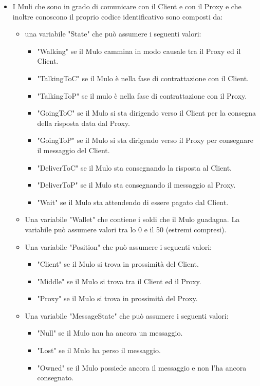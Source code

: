 \documentclass[13pt,a4paper]{article}
\begin{document}
\begin{itemize}
	
	\item I Muli che sono in grado di comunicare con il Client e con il Proxy e che inoltre conoscono il proprio codice identificativo sono composti da:
	\begin{itemize}
		\item una variabile "State" che può assumere i seguenti valori:
		\begin{itemize}
			\item "Walking" se il Mulo cammina in modo causale tra il Proxy ed il Client.
			\item "TalkingToC" se il Mulo è nella fase di contrattazione con il Client.
			\item "TalkingToP" se il mulo è nella fase di contrattazione con il Proxy.
			\item "GoingToC" se il Mulo si sta dirigendo verso il Client per la consegna della risposta data dal Proxy.
			\item "GoingToP" se il Mulo si sta dirigendo verso il Proxy per consegnare il messaggio del Client.
			\item "DeliverToC" se il Mulo sta consegnando la risposta al Client.
			\item "DeliverToP" se il Mulo sta consegnando il messaggio al Proxy.
			\item "Wait" se il Mulo sta attendendo di essere pagato dal Client.
		\end{itemize}
		\item Una variabile "Wallet" che contiene i soldi che il Mulo guadagna.  La variabile può assumere valori tra lo 0 e il 50 (estremi compresi).
		\item Una variabile "Position" che può assumere i seguenti valori:
		\begin{itemize}
			\item "Client" se il Mulo si trova in prossimità del Client.
			\item "Middle" se il Mulo si trova tra il Client ed il Proxy.
			\item "Proxy" se il Mulo si trova in prossimità del Proxy.
		\end{itemize}
	\item Una variabile "MessageState" che può assumere i seguenti valori:
	\begin{itemize}
		\item "Null" se il Mulo non ha ancora un messaggio.
		\item "Lost" se il Mulo ha perso il messaggio.
		\item "Owned" se il Mulo possiede ancora il messaggio e non l'ha ancora consegnato. 

\end{itemize}
\end{itemize}
\end{itemize}
\end{document}
